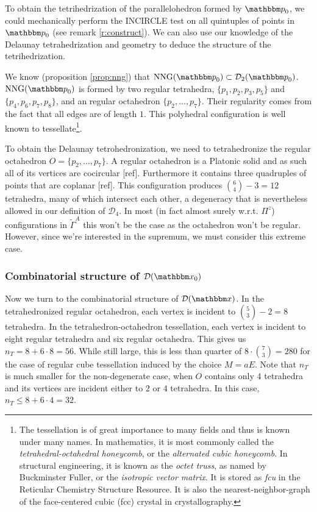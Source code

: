\begin{remark}
To obtain the tetrihedrization of the parallelohedron formed by $\p_0$, we could mechanically perform the INCIRCLE test on all quintuples of points in $\p_0$ (see remark \ref{r:construct}). We can also use our knowledge of the Delaunay tetrahedrization and geometry to deduce the structure of the tetrihedrization.

We know (proposition \ref{prop:nng}) that $\text{NNG}(\p_0) \subset \mathcal D_2(\p_0)$. $\text{NNG}(\p_0)$ is formed by two regular tetrahedra, $\{p_1,p_2,p_3,p_5\}$ and $\{p_4,p_6,p_7,p_8\}$, and an regular octahedron $\{p_2,\dots,p_7\}$. Their regularity comes from the fact that all edges are of length $1$. This polyhedral configuration is well known to tessellate\footnote{ The tessellation is of great importance to many fields and thus is known under many names. In mathematics, it is most commonly called the \textit{tetrahedral-octahedral honeycomb}, or the \textit{alternated cubic honeycomb}. In structural engineering, it is known as the \textit{octet truss}, as named by Buckminster Fuller, or the \textit{isotropic vector matrix}. It is stored as \textit{fcu} in the Reticular Chemistry Structure Resource\cite{RCSR}. It is also the nearest-neighbor-graph of the face-centered cubic (fcc) crystal in crystallography\cite{Gabbrielli12}.  }.

To obtain the Delaunay tetrohedronization, we need to tetrahedronize the regular octahedron $O=\{p_2,\dots, p_7\}$. A regular octahedron is a Platonic solid and as such all of its vertices are cocircular [ref]. Furthermore it contains three quadruples of points that are coplanar [ref]. This configuration produces $\binom{6}{4}-3 = 12$ tetrahedra, many of which intersect each other, a degeneracy that is nevertheless allowed in our definition of $\mathcal D_4$. In most (in fact almost surely w.r.t. $\Pi^z$) configurations in $\tilde\Gamma^A$ this won't be the case as the octahedron won't be regular. However, since we're interested in the supremum, we must consider this extreme case.

\subsubsection{Combinatorial structure of $\mathcal D(\x_0)$}
Now we turn to the combinatorial structure of $\mathcal D(\x)$. In the tetrahedronized regular octahedron, each vertex is incident to $\binom{5}{3}-2=8$ tetrahedra. In the tetrahedron-octahedron tessellation, each  vertex is incident to eight regular tetrahedra and six regular octahedra. This gives us $n_T = 8 + 6\cdot 8 = 56$. While still large, this is less than quarter of $8\cdot \binom{7}{3} = 280$ for the case of regular cube tessellation induced by the choice $M=aE$. Note that $n_T$ is much smaller for the non-degenerate case, when $O$ contains only $4$ tetrahedra and its vertices are incident either to $2$ or $4$ tetrahedra. In this case, $n_T\leq 8+6\cdot 4 = 32$.



\end{remark}
